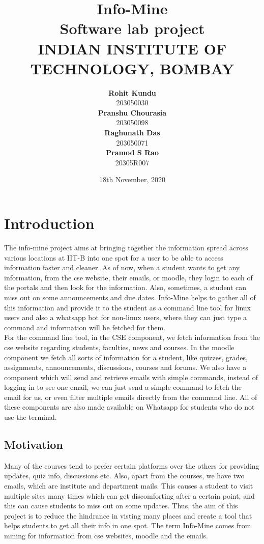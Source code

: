 \documentclass[12pt, a4paper]{article}
\title{
    \textbf{Info-Mine}\\
    {Software lab project}\\
    {INDIAN INSTITUTE OF TECHNOLOGY, BOMBAY}
}
\author{ 
    \textbf{Rohit Kundu}\\203050030\\
    \textbf{Pranshu Chourasia}\\203050098\\
    \textbf{Raghunath Das}\\203050071\\
    \textbf{Pramod S Rao}\\20305R007\\
}
\date{18th November, 2020}
\begin{document}
\maketitle

\tableofcontents

\section{Introduction}
    The info-mine project aims at bringing together the information spread across various locations at IIT-B into one spot
    for a user to be able to access information faster and cleaner. As of now, when a student wants to get any information, from the cse website, their emails, or moodle, they login to each of the portals and then look for the information. Also, sometimes, a student can miss out on some announcements and due dates. Info-Mine helps to gather all of this information and provide it to the student as a command line tool for linux users and also a whatsapp bot for non-linux users, where they can just type a command and information will be fetched for them.\\
    For the command line tool, in the CSE component, we fetch information from the cse website regarding students, faculties, news and courses. In the moodle component we fetch all sorts of information for a student, like quizzes, grades, assignments, announcements, discussions, courses and forums. We also have a component which will send and retrieve emails with simple commands, instead of logging in to see one email, we can just send a simple command to fetch the email for us, or even filter multiple emails directly from the command line. All of these components are also made available on Whatsapp for students who do not use the terminal. 

    \subsection{Motivation}
        Many of the courses tend to prefer certain platforms over the others for providing updates, quiz info, discussions etc. 
        Also, apart from the courses, we have two emails, which are institute and department mails.
        This causes a student to visit multiple sites many times which can get discomforting after a certain point, and this can cause students to miss out on some updates. 
        Thus, the aim of this project is to reduce the hindrance in visting many places and create a tool that helps students to get all their info
        in one spot. The term Info-Mine comes from mining for information from cse websites, moodle and the emails.
        
\end{document}
